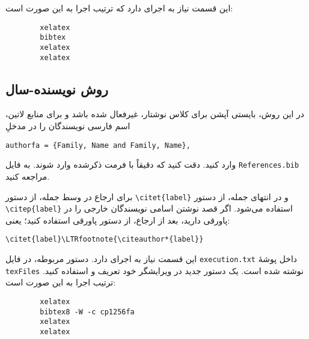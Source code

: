 این قسمت نیاز به اجرای
دارد که ترتیب اجرا به این صورت است:
\begin{latin}
	\begin{verbatim}
		xelatex
		bibtex
		xelatex
		xelatex
	\end{verbatim}
\end{latin}

\subsection{روش نویسنده-سال}
در این روش، بایستی آپشن
برای کلاس نوشتار، غیرفعال شده باشد و برای منابع لاتین، اسم فارسی نویسندگان را در مدخلِ
\begin{LTR}
	\verb|authorfa = {Family, Name and Family, Name},|
\end{LTR}\noindent
وارد کنید. دقت کنید که دقیقاً با فرمت ذکرشده وارد شوند. به فایل
\verb|References.bib|
مراجعه کنید.

برای ارجاع در وسط جمله، از دستور
\verb|\citet{label}|
و در انتهای جمله، از دستور
\verb|\citep{label}|
استفاده می‌شود. اگر قصد نوشتن اسامی نویسندگان خارجی را در پاورقی دارید،
بعد از ارجاع، از دستور پاورقی استفاده کنید؛ یعنی:
\begin{LTR}
	\verb|\citet{label}\LTRfootnote{\citeauthor*{label}}|
\end{LTR}

این قسمت نیاز به اجرای
دارد. دستور مربوطه، در فایل
\verb|execution.txt|
داخل پوشهٔ
\verb|texFiles|
نوشته شده است. یک دستور جدید در ویرایشگر خود تعریف و استفاده کنید. ترتیب اجرا به این صورت است:
\begin{latin}
	\begin{verbatim}
		xelatex
		bibtex8 -W -c cp1256fa
		xelatex
		xelatex
	\end{verbatim}
\end{latin}
\begin{RefBox}
	\vskip0pt
\end{RefBox}